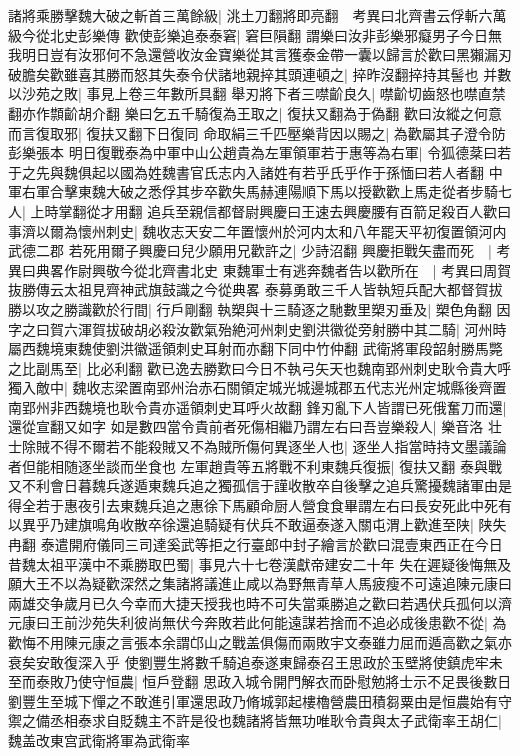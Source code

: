 諸將乘勝擊魏大破之斬首三萬餘級|{
	洮土刀翻將即亮翻　考異曰北齊書云俘斬六萬級今從北史彭樂傳}
歡使彭樂追泰泰窘|{
	窘巨隕翻}
謂樂曰汝非彭樂邪癡男子今日無我明日豈有汝邪何不急還營收汝金寶樂從其言獲泰金帶一囊以歸言於歡曰黑獺漏刃破膽矣歡雖喜其勝而怒其失泰令伏諸地親捽其頭連頓之|{
	捽昨沒翻捽持其髻也}
并數以沙苑之敗|{
	事見上卷三年數所具翻}
舉刃將下者三噤齘良久|{
	噤齘切齒怒也噤直禁翻亦作䫴齘胡介翻}
樂曰乞五千騎復為王取之|{
	復扶又翻為于偽翻}
歡曰汝縱之何意而言復取邪|{
	復扶又翻下日復同}
命取絹三千匹壓樂背因以賜之|{
	為歡屬其子澄令防彭樂張本}
明日復戰泰為中軍中山公趙貴為左軍領軍若于惠等為右軍|{
	令狐德棻曰若于之先與魏俱起以國為姓魏書官氏志内入諸姓有若乎氏乎作于孫愐曰若人者翻}
中軍右軍合擊東魏大破之悉俘其步卒歡失馬赫連陽順下馬以授歡歡上馬走從者步騎七人|{
	上時掌翻從才用翻}
追兵至親信都督尉興慶曰王速去興慶腰有百箭足殺百人歡曰事濟以爾為懷州刺史|{
	魏收志天安二年置懷州於河内太和八年罷天平初復置領河内武德二郡}
若死用爾子興慶曰兒少願用兄歡許之|{
	少詩沼翻}
興慶拒戰矢盡而死　|{
	考異曰典畧作尉興敬今從北齊書北史}
東魏軍士有逃奔魏者告以歡所在　|{
	考異曰周賀抜勝傳云太祖見齊神武旗鼓識之今從典畧}
泰募勇敢三千人皆執短兵配大都督賀拔勝以攻之勝識歡於行間|{
	行戶剛翻}
執槊與十三騎逐之馳數里槊刃垂及|{
	槊色角翻}
因字之曰賀六渾賀拔破胡必殺汝歡氣殆絶河州刺史劉洪徽從旁射勝中其二騎|{
	河州時屬西魏境東魏使劉洪徽遥領刺史耳射而亦翻下同中竹仲翻}
武衛將軍段韶射勝馬斃之比副馬至|{
	比必利翻}
歡已逸去勝歎曰今日不執弓矢天也魏南郢州刺史耿令貴大呼獨入敵中|{
	魏收志梁置南郢州治赤石關領定城光城邊城郡五代志光州定城縣後齊置南郢州非西魏境也耿令貴亦遥領刺史耳呼火故翻}
鋒刃亂下人皆謂已死俄奮刀而還|{
	還從宣翻又如字}
如是數四當令貴前者死傷相繼乃謂左右曰吾豈樂殺人|{
	樂音洛}
壮士除賊不得不爾若不能殺賊又不為賊所傷何異逐坐人也|{
	逐坐人指當時持文墨議論者但能相随逐坐談而坐食也}
左軍趙貴等五將戰不利東魏兵復振|{
	復扶又翻}
泰與戰又不利會日暮魏兵遂遁東魏兵追之獨孤信于謹收散卒自後擊之追兵驚擾魏諸軍由是得全若于惠夜引去東魏兵追之惠徐下馬顧命厨人營食食畢謂左右曰長安死此中死有以異乎乃建旗鳴角收散卒徐還追騎疑有伏兵不敢逼泰遂入關屯渭上歡進至陕|{
	陕失冉翻}
泰遣開府儀同三司達奚武等拒之行臺郎中封子繪言於歡曰混壹東西正在今日昔魏太祖平漢中不乘勝取巴蜀|{
	事見六十七卷漢獻帝建安二十年}
失在遲疑後悔無及願大王不以為疑歡深然之集諸將議進止咸以為野無青草人馬疲瘦不可遠追陳元康曰兩雄交争歲月已久今幸而大捷天授我也時不可失當乘勝追之歡曰若遇伏兵孤何以濟元康曰王前沙苑失利彼尚無伏今奔敗若此何能遠謀若捨而不追必成後患歡不從|{
	為歡悔不用陳元康之言張本余謂邙山之戰盖俱傷而兩敗宇文泰雖力屈而遁高歡之氣亦衰矣安敢復深入乎}
使劉豐生將數千騎追泰遂東歸泰召王思政於玉壁將使鎮虎牢未至而泰敗乃使守恒農|{
	恒戶登翻}
思政入城令開門解衣而卧慰勉將士示不足畏後數日劉豐生至城下憚之不敢進引軍還思政乃脩城郭起樓櫓營農田積芻粟由是恒農始有守禦之備丞相泰求自貶魏主不許是役也魏諸將皆無功唯耿令貴與太子武衛率王胡仁|{
	魏盖改東宫武衛將軍為武衛率}
